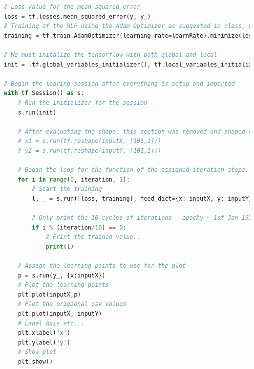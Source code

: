 \documentclass[a4paper, 10pt]{IEEEconf}
\begin{document}
\begin{lstlisting}[language = Python]
# Loss value for the mean squared error
loss = tf.losses.mean_squared_error(y, y_)
# Training of the MLP using the Adam Optimizer as suggested in class, please see variaible for assigned learn rate
training = tf.train.AdamOptimizer(learning_rate=learnRate).minimize(loss)

# We must initalize the tensorflow with both global and local
init = [tf.global_variables_initializer(), tf.local_variables_initializer()]

# Begin the learing session after everything is setup and imported
with tf.Session() as s:
	# Run the initializer for the session
    s.run(init)

	# After evaluating the shape, this section was removed and shaped on the import of the csv
    # x1 = s.run(tf.reshape(inputX, [101,1])) 
    # y2 = s.run(tf.reshape(inputY, [101,1]))

	# Begin the loop for the function of the assigned iteration steps.
    for i in range(0, iteration, 1):
		# Start the training 
        l, _ = s.run([loss, training], feed_dict={x: inputX, y: inputY})

		# Only print the 10 cycles of iterations - epochy ~ 1st Jan 1970 lol...
        if i % (iteration/10) == 0:
			# Print the trained value..
            print(l)
	
	# Assign the learning points to use for the plot
    p = s.run(y_, {x:inputX}) 
	# Plot the learning points
    plt.plot(inputX,p) 
	# Plot the origional csv values
    plt.plot(inputX, inputY) 
	# Label Axis etc...
    plt.xlabel('x') 
    plt.ylabel('y') 
	# Show plot
    plt.show()
\end{lstlisting}
\end{document}
